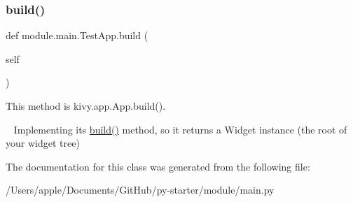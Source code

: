\subsubsection{\texorpdfstring{build()}{build()}}
{\footnotesize\ttfamily def module.\+main.\+Test\+App.\+build (\begin{DoxyParamCaption}\item[{}]{self }\end{DoxyParamCaption})}



This method is kivy.\+app.\+App.\+build(). 

~\newline
 Implementing its \mbox{\hyperlink{classmodule_1_1main_1_1_test_app_a56f9c311e4db9ec9a313687f4c6d5faf}{build()}} method, so it returns a Widget instance (the root of your widget tree) 

The documentation for this class was generated from the following file\+:\begin{DoxyCompactItemize}
\item 
/\+Users/apple/\+Documents/\+Git\+Hub/py-\/starter/module/main.\+py\end{DoxyCompactItemize}

